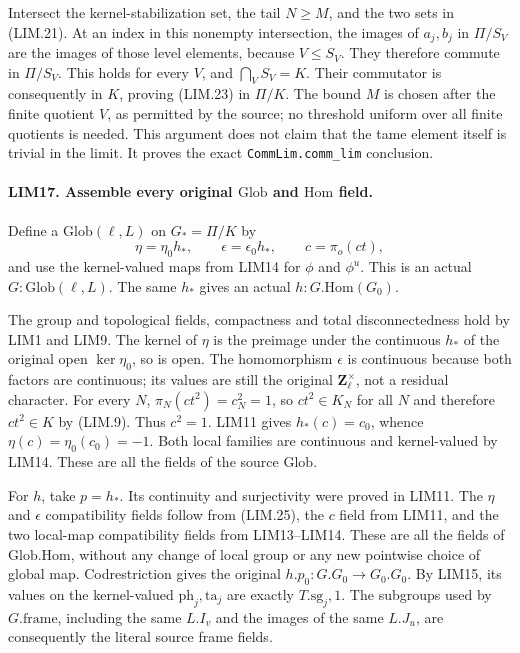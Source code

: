 Intersect the kernel-stabilization set, the tail \(N\ge M\),
and the two sets in (LIM.21).  At an index in this nonempty
intersection, the images of \(a_j,b_j\) in \(\Pi/S_V\)
are the images of those level elements, because \(V\le S_V\).
They therefore commute in \(\Pi/S_V\).
This holds for every \(V\), and \(\bigcap_V S_V=K\).
Their commutator is consequently in \(K\), proving (LIM.23)
in \(\Pi/K\).
The bound \(M\) is chosen after the finite quotient \(V\), as
permitted by the source; no threshold uniform over all finite
quotients is needed.  This argument does not claim that the
tame element itself is trivial in the limit.
It proves the exact \texttt{CommLim.comm\_lim} conclusion.

\paragraph{LIM17. Assemble every original \(\mathrm{Glob}\) and \(\mathrm{Hom}\) field.}
\label{claim:LIM17}
Define a \(\mathrm{Glob}(\ell,L)\) on \(G_*=\Pi/K\) by
\[
 \eta=\eta_0h_*,\qquad \epsilon=\epsilon_0h_*,\qquad
 c=\pi_o(ct),
 \tag{LIM.25}
\]
and use the kernel-valued maps from LIM14 for \(\phi\) and
\(\phi^u\).  This is an actual \(G:\mathrm{Glob}(\ell,L)\).
The same \(h_*\) gives an actual \(h:G.\mathrm{Hom}(G_0)\).

The group and topological fields, compactness and total
disconnectedness hold by LIM1 and LIM9.
The kernel of \(\eta\) is the preimage under the continuous
\(h_*\) of the original open \(\ker\eta_0\), so is open.
The homomorphism \(\epsilon\) is continuous because both factors
are continuous; its values are still the original
\(\mathbf Z_\ell^\times\), not a residual character.
For every \(N\),
\(\pi_N(ct^2)=c_N^2=1\), so \(ct^2\in K_N\) for all \(N\)
and therefore \(ct^2\in K\) by (LIM.9).
Thus \(c^2=1\).
LIM11 gives \(h_*(c)=c_0\), whence
\(\eta(c)=\eta_0(c_0)=-1\).
Both local families are continuous and kernel-valued by LIM14.
These are all the fields of the source \(\mathrm{Glob}\).

For \(h\), take \(p=h_*\).
Its continuity and surjectivity were proved in LIM11.
The \(\eta\) and \(\epsilon\) compatibility fields follow from
(LIM.25), the \(c\) field from LIM11, and the two local-map
compatibility fields from LIM13--LIM14.
These are all the fields of \(\mathrm{Glob.Hom}\), without any
change of local group or any new pointwise choice of global map.
Codrestriction gives the original \(h.p_0:G.G_0\to G_0.G_0\).
By LIM15, its values on the kernel-valued
\(\mathrm{ph}_j,\mathrm{ta}_j\) are exactly
\(T.\mathrm{sg}_j,1\).
The subgroups used by \(G.\mathrm{frame}\), including the same
\(L.I_v\) and the images of the same \(L.J_u\), are consequently
the literal source frame fields.

